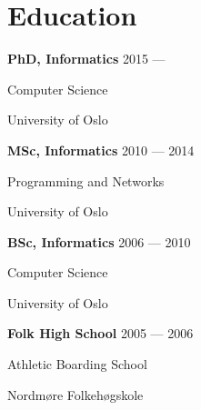 \section{Education}
\parbox[t][][t]{\linewidth}{
	\parbox{\linewidth}{\textbf{PhD, Informatics} \hfill {{2015 --- \phantom{2018}}}}
	\parbox{\linewidth}{{Computer Science}}
	\parbox{\linewidth}{{University of Oslo}}
	\smallskip
}

\parbox[t][][t]{\linewidth}{
	\parbox{\linewidth}{\textbf{MSc, Informatics} \hfill {{2010 --- 2014}}}
	\parbox{\linewidth}{{Programming and Networks}}
	\parbox{\linewidth}{{University of Oslo}}
	\smallskip
}

\parbox[t][][t]{\linewidth}{
	\parbox{\linewidth}{\textbf{BSc, Informatics} \hfill {{2006 --- 2010}}}
	\parbox{\linewidth}{{Computer Science}}
	\parbox{\linewidth}{{University of Oslo}}
	\smallskip
}

\parbox[t][][t]{\linewidth}{
	\parbox{\linewidth}{\textbf{Folk High School} \hfill{{2005 --- 2006}}}
	\parbox{\linewidth}{Athletic Boarding School}
	\parbox{\linewidth}{Nordmøre Folkehøgskole}
	\smallskip
}

